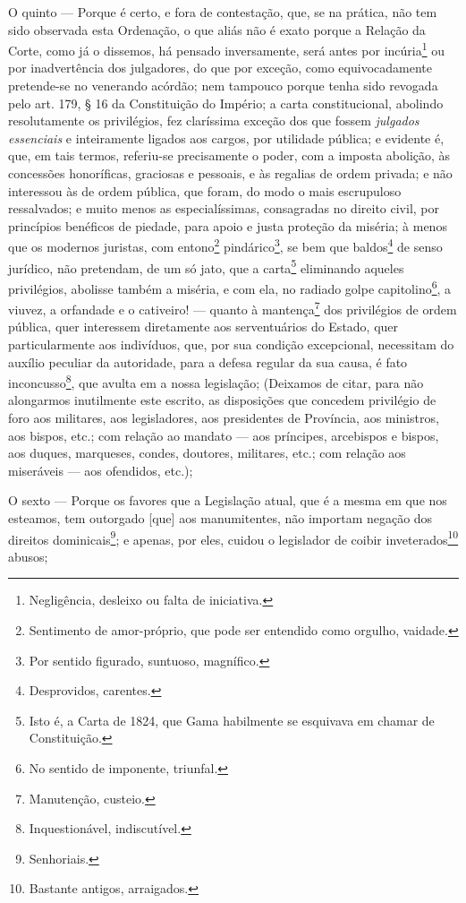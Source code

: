 O quinto --- Porque é certo, e fora de contestação, que, se na prática,
não tem sido observada esta Ordenação, o que aliás não é exato porque a
Relação da Corte, como já o dissemos, há pensado inversamente, será
antes por incúria\footnote{Negligência, desleixo ou falta de
  iniciativa.} ou por inadvertência dos julgadores, do que por exceção,
como equivocadamente pretende-se no venerando acórdão; nem tampouco
porque tenha sido revogada pelo art. 179, § 16 da Constituição do
Império; a carta constitucional, abolindo resolutamente os privilégios,
fez claríssima exceção dos que fossem \emph{julgados essenciais} e
inteiramente ligados aos cargos, por utilidade pública; e evidente é,
que, em tais termos, referiu-se precisamente o poder, com a imposta
abolição, às concessões honoríficas, graciosas e pessoais, e às regalias
de ordem privada; e não interessou às de ordem pública, que foram, do
modo o mais escrupuloso ressalvados; e muito menos as especialíssimas,
consagradas no direito civil, por princípios benéficos de piedade, para
apoio e justa proteção da miséria; à menos que os modernos juristas, com
entono\footnote{Sentimento de amor-próprio, que pode ser entendido
  como orgulho, vaidade.} pindárico\footnote{Por sentido figurado,
  suntuoso, magnífico.}, se bem que baldos\footnote{Desprovidos,
  carentes.} de senso jurídico, não pretendam, de um só jato, que a
carta\footnote{Isto é, a Carta de 1824, que Gama habilmente se
  esquivava em chamar de Constituição.} eliminando aqueles privilégios,
abolisse também a miséria, e com ela, no radiado golpe
capitolino\footnote{No sentido de imponente, triunfal.}, a viuvez, a
orfandade e o cativeiro! --- quanto à mantença\footnote{Manutenção,
  custeio.} dos privilégios de ordem pública, quer interessem
diretamente aos serventuários do Estado, quer particularmente aos
indivíduos, que, por sua condição excepcional, necessitam do auxílio
peculiar da autoridade, para a defesa regular da sua causa, é fato
inconcusso\footnote{Inquestionável, indiscutível.}, que avulta em a
nossa legislação; (Deixamos de citar, para não alongarmos inutilmente
este escrito, as disposições que concedem privilégio de foro aos
militares, aos legisladores, aos presidentes de Província, aos
ministros, aos bispos, etc.; com relação ao mandato --- aos príncipes,
arcebispos e bispos, aos duques, marqueses, condes, doutores, militares,
etc.; com relação aos miseráveis --- aos ofendidos, etc.);

O sexto --- Porque os favores que a Legislação atual, que é a mesma em
que nos esteamos, tem outorgado {[}que{]} aos manumitentes, não importam
negação dos direitos dominicais\footnote{Senhoriais.}; e apenas, por
eles, cuidou o legislador de coibir inveterados\footnote{Bastante
  antigos, arraigados.} abusos;

